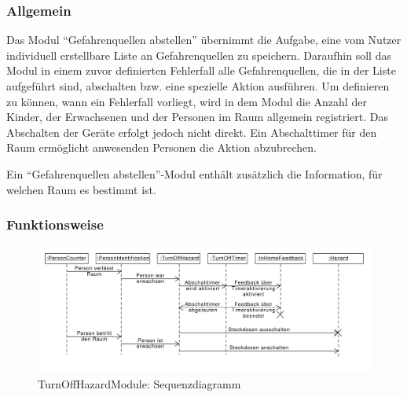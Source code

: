 \subsubsection{Allgemein}
Das Modul "`Gefahrenquellen abstellen"' übernimmt die Aufgabe, eine vom Nutzer individuell erstellbare Liste an Gefahrenquellen zu speichern. Daraufhin soll das Modul in einem zuvor definierten Fehlerfall alle Gefahrenquellen, die in der Liste aufgeführt sind, abschalten bzw. eine spezielle Aktion ausführen. Um definieren zu können, wann ein Fehlerfall vorliegt, wird in dem Modul die Anzahl der Kinder, der Erwachsenen und der Personen im Raum allgemein registriert. Das Abschalten der Geräte erfolgt jedoch nicht direkt. Ein Abschalttimer für den Raum ermöglicht anwesenden Personen die Aktion abzubrechen.

Ein "`Gefahrenquellen abstellen"'-Modul enthält zusätzlich die Information, für welchen Raum es bestimmt ist.

\subsubsection{Funktionsweise}
\begin{figure}[h!]
	\centering
	\includegraphics[width=\textwidth]{img/Modulkonzeption/TurnOffHazardSequence.pdf}
	\caption{TurnOffHazardModule: Sequenzdiagramm}
	\label{fig:turnOffHazard}
\end{figure}

